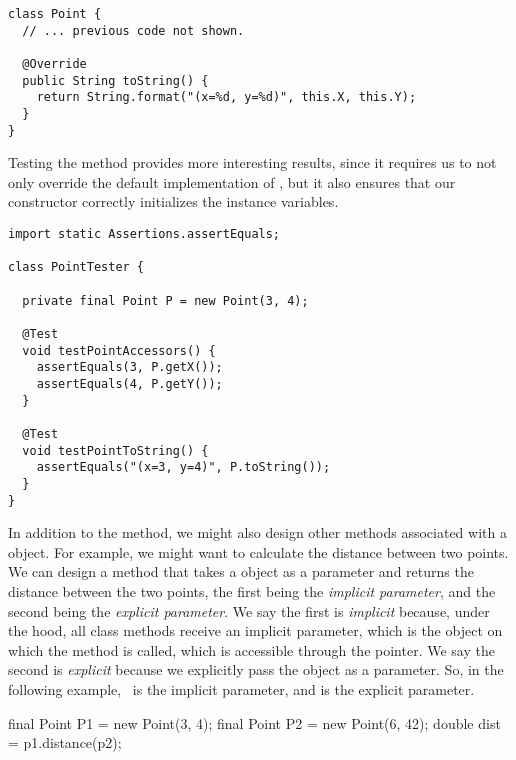 \begin{lstlisting}[language=MyJava]
class Point {
  // ... previous code not shown.

  @Override
  public String toString() {
    return String.format("(x=%d, y=%d)", this.X, this.Y);
  }
}
\end{lstlisting}

Testing the  method provides more interesting results, since it requires us to not only override the default implementation of , but it also ensures that our constructor correctly initializes the instance variables. 

\enlargethispage{2\baselineskip}
\begin{lstlisting}[language=MyJava]
import static Assertions.assertEquals;

class PointTester {

  private final Point P = new Point(3, 4);

  @Test
  void testPointAccessors() {
    assertEquals(3, P.getX());
    assertEquals(4, P.getY());
  }

  @Test
  void testPointToString() {
    assertEquals("(x=3, y=4)", P.toString());
  }
}
\end{lstlisting}

In addition to the  method, we might also design other methods associated with a  object. 
For example, we might want to calculate the distance between two points. 
We can design a method that takes a  object as a parameter and returns the distance between the two points, the first being the \emph{implicit parameter}, and the second being the \emph{explicit parameter}. 
We say the first is \emph{implicit} because, under the hood, all class methods receive an implicit parameter, which is the object on which the method is called, which is accessible through the  pointer. 
We say the second is \emph{explicit} because we explicitly pass the object as a parameter. 
So, in the following example,~ is the implicit parameter, and  is the explicit parameter.

\begin{verbnobox}[\small]
final Point P1 = new Point(3, 4);
final Point P2 = new Point(6, 42);
double dist = p1.distance(p2);
\end{verbnobox}

